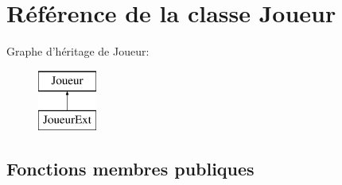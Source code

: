 \hypertarget{classJoueur}{\section{Référence de la classe Joueur}
\label{classJoueur}
}
Graphe d'héritage de Joueur\-:\begin{figure}[H]
\begin{center}
\leavevmode
\includegraphics[height=2.000000cm]{classJoueur}
\end{center}
\end{figure}
\subsection*{Fonctions membres publiques}
